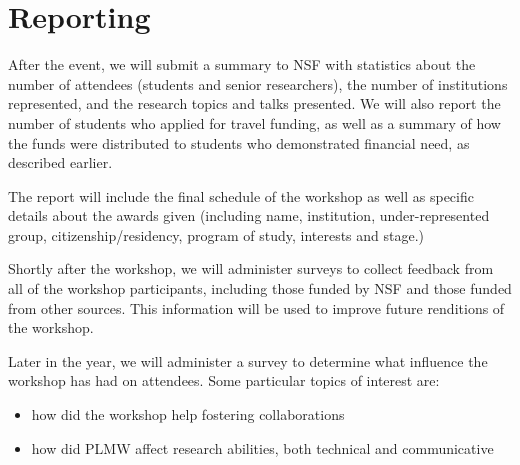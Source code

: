 \documentclass[11pt]{article}
\newcommand{\parahead}[1]{\paragraph{#1}}
\begin{document}
%
%
%

\section{Reporting}

After the event, we will submit a summary to NSF with statistics about
the number of attendees (students and senior researchers), the number
of institutions represented, and the research topics and talks
presented. We will also report the number of students who applied for
travel funding, as well as a summary of how the funds were
distributed to students who demonstrated financial need, as described
earlier.

The report will include
the final schedule of the workshop as well as specific details about
the awards given (including name, institution, under-represented group,
citizenship/residency, program of study, interests and stage.)

Shortly after the workshop, we will administer
surveys to collect feedback from all of the workshop participants,
including those funded by NSF and those funded from other sources.
This information will be used to improve future renditions of the workshop.

Later in the year, we will administer a survey to determine what influence the workshop has had on attendees.
Some particular topics of interest are:
\begin{itemize}
\item how did the workshop help fostering collaborations
\item how did PLMW affect research abilities, both technical and communicative
\end{itemize}
\end{document}
